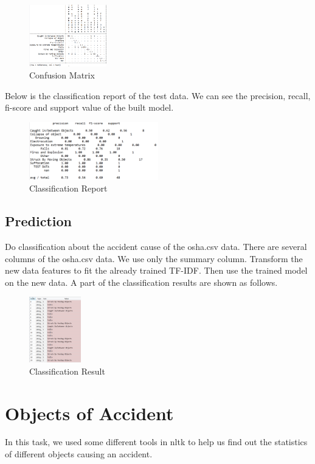 \documentclass[DIV=calc, paper=a4, fontsize=11pt, twocolumn]{scrartcl}	 %
\begin{document}
\begin{figure}[h!]
  \centering
      \includegraphics[width=0.3\textwidth]{confusion.png}
  \caption{Confusion Matrix}
\end{figure}

Below is the classification report of the test data. We can see the
precision, recall, fi-score and support value of the built model.


\begin{figure}[h!]
  \centering
      \includegraphics[width=0.5\textwidth]{class_report.png}
   \caption{Classification Report}
\end{figure}

\subsection{Prediction}

Do classification about the accident cause of the osha.csv data. There
are several columns of the osha.csv data. We use only the summary
column. Transform the new data features to fit the already trained
TF-IDF. Then use the trained model on the new data. A part of the
classification results are shown as follows.

\begin{figure}[h!]
  \centering
      \includegraphics[width=0.2\textwidth]{class_result.png}
   \caption{Classification Result}
\end{figure}

\section{Objects of Accident}
In this task, we used some different tools in nltk to help us find out
the statistics of different objects causing an accident.
\end{document}
